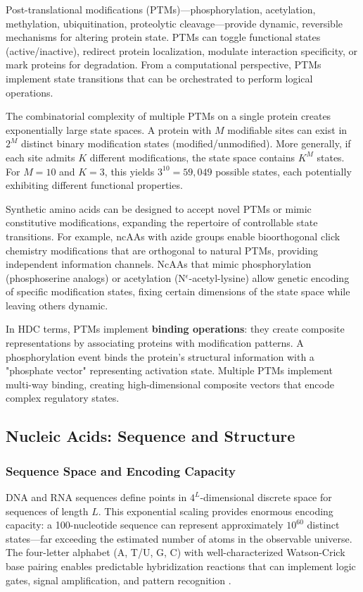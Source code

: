 \documentclass[12pt]{article}
\begin{document}
Post-translational modifications (PTMs)—phosphorylation, acetylation, methylation, ubiquitination, proteolytic cleavage—provide dynamic, reversible mechanisms for altering protein state. PTMs can toggle functional states (active/inactive), redirect protein localization, modulate interaction specificity, or mark proteins for degradation. From a computational perspective, PTMs implement state transitions that can be orchestrated to perform logical operations.

The combinatorial complexity of multiple PTMs on a single protein creates exponentially large state spaces. A protein with $M$ modifiable sites can exist in $2^M$ distinct binary modification states (modified/unmodified). More generally, if each site admits $K$ different modifications, the state space contains $K^M$ states. For $M = 10$ and $K = 3$, this yields $3^{10} = 59,049$ possible states, each potentially exhibiting different functional properties.

Synthetic amino acids can be designed to accept novel PTMs or mimic constitutive modifications, expanding the repertoire of controllable state transitions. For example, ncAAs with azide groups enable bioorthogonal click chemistry modifications that are orthogonal to natural PTMs, providing independent information channels. NcAAs that mimic phosphorylation (phosphoserine analogs) or acetylation (N$^\epsilon$-acetyl-lysine) allow genetic encoding of specific modification states, fixing certain dimensions of the state space while leaving others dynamic.

In HDC terms, PTMs implement \textbf{binding operations}: they create composite representations by associating proteins with modification patterns. A phosphorylation event binds the protein's structural information with a "phosphate vector" representing activation state. Multiple PTMs implement multi-way binding, creating high-dimensional composite vectors that encode complex regulatory states.

\subsection{Nucleic Acids: Sequence and Structure}

\subsubsection{Sequence Space and Encoding Capacity}

DNA and RNA sequences define points in $4^L$-dimensional discrete space for sequences of length $L$. This exponential scaling provides enormous encoding capacity: a 100-nucleotide sequence can represent approximately $10^{60}$ distinct states—far exceeding the estimated number of atoms in the observable universe. The four-letter alphabet (A, T/U, G, C) with well-characterized Watson-Crick base pairing enables predictable hybridization reactions that can implement logic gates, signal amplification, and pattern recognition \citep{Qian2011}.
\end{document}
